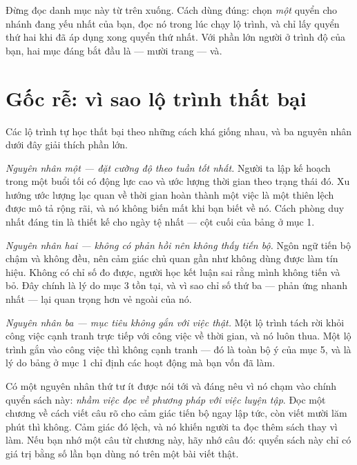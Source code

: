 \documentclass[../../english.tex]{subfiles}
\begin{document}
\begin{cannho}
Đừng đọc danh mục này từ trên xuống. Cách dùng đúng: chọn \emph{một} quyển cho nhánh đang yếu nhất của bạn, đọc nó trong lúc chạy lộ trình, và chỉ lấy quyển thứ hai khi đã áp dụng xong quyển thứ nhất. Với phần lớn người ở trình độ của bạn, hai mục đáng bắt đầu là\cite{gopenswan1990} --- mười trang --- và\cite{williams2016}.
\end{cannho}

\section{Gốc rễ: vì sao lộ trình thất bại}

Các lộ trình tự học thất bại theo những cách khá giống nhau, và ba nguyên nhân dưới đây giải thích phần lớn.

\emph{Nguyên nhân một --- đặt cường độ theo tuần tốt nhất.} Người ta lập kế hoạch trong một buổi tối có động lực cao và ước lượng thời gian theo trạng thái đó. Xu hướng ước lượng lạc quan về thời gian hoàn thành một việc là một thiên lệch được mô tả rộng rãi, và nó không biến mất khi bạn biết về nó. Cách phòng duy nhất đáng tin là thiết kế cho ngày tệ nhất --- cột cuối của bảng ở mục 1.

\emph{Nguyên nhân hai --- không có phản hồi nên không thấy tiến bộ.} Ngôn ngữ tiến bộ chậm và không đều, nên cảm giác chủ quan gần như không dùng được làm tín hiệu. Không có chỉ số đo được, người học kết luận sai rằng mình không tiến và bỏ. Đây chính là lý do mục 3 tồn tại, và vì sao chỉ số thứ ba --- phản ứng nhanh nhất --- lại quan trọng hơn vẻ ngoài của nó.

\emph{Nguyên nhân ba --- mục tiêu không gắn với việc thật.} Một lộ trình tách rời khỏi công việc cạnh tranh trực tiếp với công việc về thời gian, và nó luôn thua. Một lộ trình gắn vào công việc thì không cạnh tranh --- đó là toàn bộ ý của  mục 5, và là lý do bảng ở mục 1 chỉ định các hoạt động mà bạn vốn đã làm.

Có một nguyên nhân thứ tư ít được nói tới và đáng nêu vì nó chạm vào chính quyển sách này: \emph{nhầm việc đọc về phương pháp với việc luyện tập}. Đọc một chương về cách viết câu rõ cho cảm giác tiến bộ ngay lập tức, còn viết mười lăm phút thì không. Cảm giác đó lệch, và nó khiến người ta đọc thêm sách thay vì làm. Nếu bạn nhớ một câu từ chương này, hãy nhớ câu đó: quyển sách này chỉ có giá trị bằng số lần bạn dùng nó trên một bài viết thật.
\end{document}
